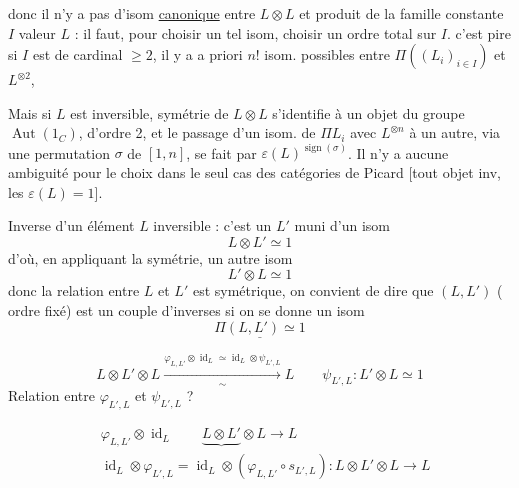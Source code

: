 
donc il n'y a pas d'isom \uline{canonique} entre $L\otimes L$ et  produit de la famille constante  $I$  valeur $L$ : il faut, pour choisir un tel isom, choisir un ordre total sur $I$. c'est pire si $I$ est de cardinal $\geq2$, il y a  a priori $n!$ isom. possibles entre $\Pi((L_i)_{i\in I})$ et $L^{\otimes 2}$,

Mais si $L$ est inversible,  symétrie de $L\otimes L$  s'identifie à un objet  du groupe $\operatorname{Aut}(1_C)$, d'ordre 2, et le passage d'un isom. de $\Pi L_i$ avec $L^{\otimes n}$ à un autre, via une permutation $\sigma$ de $[1,n]$, se fait par $\varepsilon(L)^{\operatorname{sign}(\sigma)}$. Il n'y a aucune ambiguité pour le choix dans le seul cas des catégories de Picard [tout objet inv, les $\varepsilon(L)=1$].


Inverse d'un élément $L$ inversible : c'est un $L'$ muni d'un isom
\[L\otimes L'\simeq1\]
d'où, en appliquant la symétrie, un  autre isom
\[L'\otimes L\simeq1\]
donc la relation entre $L$ et $L'$ est symétrique, on convient de dire que $(L,L')$ ( ordre fixé) est un couple d'inverses si on se donne un isom
\[\underline{\Pi(L,L')\simeq1}\]

\uline{}

\[L\otimes L'\otimes L\xrightarrow[\sim]{\varphi_{L,L'}\otimes\operatorname{id}_L\simeq\operatorname{id}_L\otimes\psi_{L',L}}L\qquad
\psi_{L',L}:L'\otimes L\simeq1\]
Relation entre $\varphi_{L',L}$ et $\psi_{L',L}$ ? 

\[
\begin{aligned}
&\varphi_{L,L'}\otimes\operatorname{id}_L\qquad\underbrace{L\otimes L'}\otimes L\longrightarrow L\\
&\operatorname{id}_L\otimes\varphi_{L',L}=\operatorname{id}_L\otimes(\varphi_{L,L'}\circ s_{L',L}):L\otimes L'\otimes L\longrightarrow L
\end{aligned}
\]

